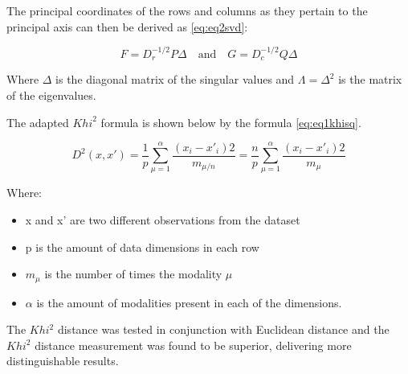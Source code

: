 The principal coordinates of the rows and columns as they pertain to the principal axis can then be derived as \ref{eq:eq2svd}:   

\begin{equation}  F=D_{r}^{-1/2}P\Delta  \quad \textrm{and} \quad G=D_{c}^{-1/2}Q\Delta \label{eq:eq2svd} \end{equation}

Where $\Delta$ is the diagonal matrix of the singular values and $\Lambda = {\Delta}^2$ is the matrix of the eigenvalues.

The adapted ${Khi}^2$ formula is shown below by the formula \ref{eq:eq1khisq}.

\begin{equation} D^{2}(x,x')=\frac{1}{p}\sum^{\alpha}_{\mu =1} \frac{(x_{i}-x'_{i})2}{m_{\mu /n}} = \frac{n}{p}\sum^{\alpha}_{\mu =1}\frac{(x_{i}-x'_{i})2}{m_{\mu }} \label{eq:eq1khisq} \end{equation}

Where:
\begin{itemize}
\item[] x and x' are two different observations from the dataset
\item[] p is the amount of data dimensions in each row
\item[] $m_{\mu}$ is the number of times the modality $\mu$
\item[] $\alpha$ is the amount of modalities present in each of the dimensions.
\end{itemize}

The $Khi^{2}$ distance was tested in conjunction with Euclidean distance and the $Khi^{2}$ distance measurement was found to be superior, delivering more distinguishable results.

